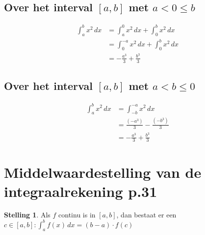\documentclass{article}
\theoremstyle{definition}
\newtheorem*{Stelling}{Stelling}
\begin{document}
\subsection{Over het interval $\left[a,b\right]$ met $a<0\leq b$}
\begin{align*}
  \displaystyle\int_{a}^{b}x^2\,dx&=\displaystyle\int_{a}^{0}x^2\,dx + \displaystyle\int_{0}^{b}x^2\,dx\\
                                  &=\displaystyle\int_{0}^{-a}x^2\,dx + \displaystyle\int_{0}^{b}x^2\,dx\\
                                  &=-\frac{a^3}{3} + \frac{b^3}{3}
\end{align*}
\subsection{Over het interval $\left[a,b\right]$ met $a<b\leq 0$}
\begin{align*}  
\displaystyle\int_{a}^{b}x^2\, dx &= \displaystyle\int_{-b}^{-a}x^2\,dx\\
                                  &=\frac{\left(-a^3\right)}{3}-\frac{\left(-b^3\right)}{3}\\
                                  &=-\frac{a^3}{3}+\frac{b^3}{3}
\end{align*}
\section{Middelwaardestelling van de integraalrekening p.31}
\begin{Stelling}
  Als $f$ continu is in $\left[a,b\right]$, dan bestaat er een $c \in \left[a, b\right]: \displaystyle\int_{a}^{b}f\left(x\right)\,dx = \left(b-a\right)\cdot f\left(c\right)$
\end{Stelling}
\end{document}

